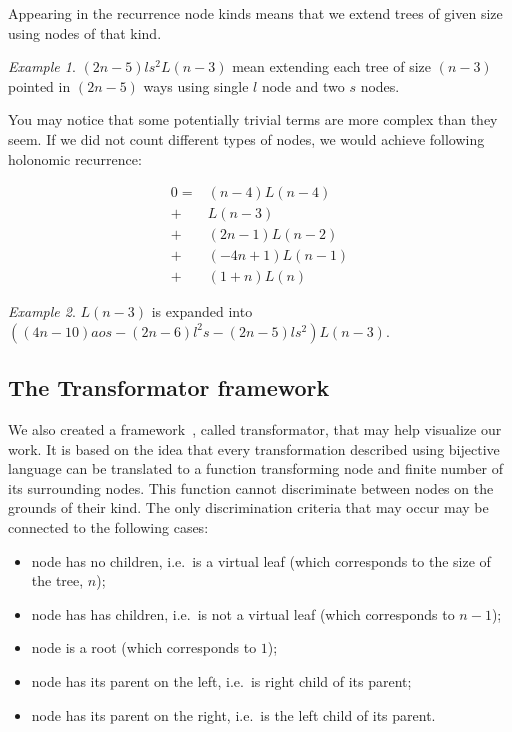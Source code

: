 \documentclass[final]{article}
\theoremstyle{definition}
\theoremstyle{remark}
\newtheorem{example}{Example}[subsection]
\begin{document}
Appearing in the recurrence node kinds means that we extend trees of given size using nodes of that kind.

\begin{example}
    \((2n - 5) l s^2 L(n - 3)\) mean extending each tree of size \((n - 3)\) pointed in \((2n - 5)\) ways using single \(l\) node and two \(s\) nodes.
\end{example}

You may notice that some potentially trivial terms are more complex than they seem. If we did not count different types of nodes, we would achieve following holonomic recurrence:

\[\begin{array}{rl}
        0 =& (n - 4) L(n - 4)\\
        +& L(n - 3)\\
        +& (2 n - 1) L(n - 2)\\
        +& (-4 n + 1) L(n - 1)\\
        +& (1 + n) L(n)
\end{array}\]

\begin{example}
    \(L(n-3)\) is expanded into \(((4 n - 10) a o s - (2 n - 6) l^2 s - (2 n - 5) l s^2) L(n - 3)\).
\end{example}


\subsection{The Transformator framework}%
\label{sub:the_framework}

We also created a framework~\cite{transformator}, called transformator, that may help visualize our work. It is based on the idea that every transformation described using bijective language can be translated to a function transforming node and finite number of its surrounding nodes. This function cannot discriminate between nodes on the grounds of their kind. The only discrimination criteria that may occur may be connected to the following cases:
\begin{itemize}
    \item node has no children, i.e.~is a virtual leaf (which corresponds to the size of the tree, \(n\));
    \item node has has children, i.e.~is not a virtual leaf (which corresponds to \(n - 1\));
    \item node is a root (which corresponds to \(1\));
    \item node has its parent on the left, i.e.~is right child of its parent;
    \item node has its parent on the right, i.e.~is the left child of its parent.
\end{itemize}
\end{document}
